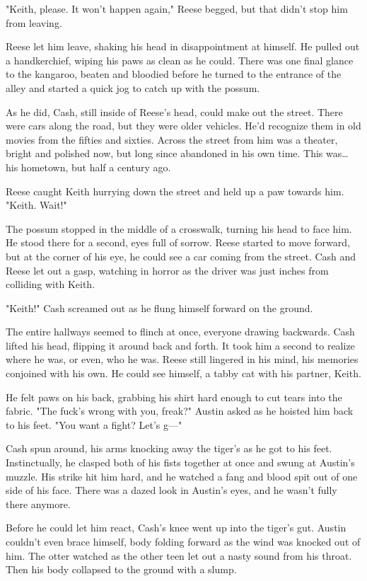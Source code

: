 "Keith, please. It won't happen again," Reese begged, but that didn't stop him from leaving.

Reese let him leave, shaking his head in disappointment at himself. He pulled out a handkerchief, wiping his paws as clean as he could. There was one final glance to the kangaroo, beaten and bloodied before he turned to the entrance of the alley and started a quick jog to catch up with the possum.

As he did, Cash, still inside of Reese's head, could make out the street. There were cars along the road, but they were older vehicles. He'd recognize them in old movies from the fifties and sixties. Across the street from him was a theater, bright and polished now, but long since abandoned in his own time. This was\ldots{} his hometown, but half a century ago.

Reese caught Keith hurrying down the street and held up a paw towards him. "Keith. Wait!"

The possum stopped in the middle of a crosswalk, turning his head to face him. He stood there for a second, eyes full of sorrow. Reese started to move forward, but at the corner of his eye, he could see a car coming from the street. Cash and Reese let out a gasp, watching in horror as the driver was just inches from colliding with Keith.

"Keith!" Cash screamed out as he flung himself forward on the ground.

The entire hallways seemed to flinch at once, everyone drawing backwards. Cash lifted his head, flipping it around back and forth. It took him a second to realize where he was, or even, who he was. Reese still lingered in his mind, his memories conjoined with his own. He could see himself, a tabby cat with his partner, Keith.

He felt paws on his back, grabbing his shirt hard enough to cut tears into the fabric. "The fuck's wrong with you, freak?" Austin asked as he hoisted him back to his feet. "You want a fight? Let's g---"

Cash spun around, his arms knocking away the tiger's as he got to his feet. Instinctually, he clasped both of his fists together at once and swung at Austin's muzzle. His strike hit him hard, and he watched a fang and blood spit out of one side of his face. There was a dazed look in Austin's eyes, and he wasn't fully there anymore.

Before he could let him react, Cash's knee went up into the tiger's gut. Austin couldn't even brace himself, body folding forward as the wind was knocked out of him. The otter watched as the other teen let out a nasty sound from his throat. Then his body collapsed to the ground with a slump.


